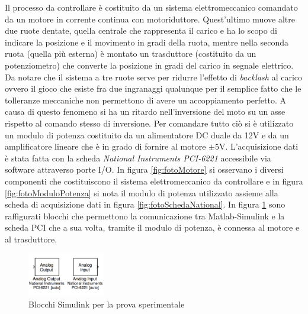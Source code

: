 	\noindent Il processo da controllare è costituito da un sistema elettromeccanico comandato da un motore in corrente continua con motoriduttore. Quest'ultimo muove altre due ruote dentate, quella centrale che rappresenta il carico e ha lo scopo di indicare la posizione e il movimento in gradi della ruota, mentre nella seconda ruota (quella più esterna) è montato un trasduttore (costituito da un potenziometro) che converte la posizione in gradi del carico in segnale elettrico. Da notare che il sistema a tre ruote serve per ridurre l'effetto di \textit{backlash} al carico ovvero il gioco che esiste fra due ingranaggi qualunque per il semplice fatto che le tolleranze meccaniche non permettono di avere un accoppiamento perfetto. A causa di questo fenomeno si ha un ritardo nell'inversione del moto su un asse rispetto al comando stesso di inversione. Per comandare tutto ciò si è utilizzato un modulo di potenza costituito da un alimentatore DC duale da 12V e da un amplificatore lineare che è in grado di fornire al motore $\pm 5$V. L'acquisizione dati è stata fatta con la scheda \textit{National Instruments PCI-6221} accessibile via software attraverso porte I/O. In figura \ref{fig:fotoMotore} si osservano i diversi componenti che costituiscono il sistema elettromeccanico da controllare e in figura \ref{fig:fotoModuloPotenza} si nota il modulo di potenza utilizzato assieme alla scheda di acquisizione dati in figura \ref{fig:fotoSchedaNational}. In figura \ref{fig:blocchiSimulink} sono raffigurati blocchi che permettono la comunicazione tra Matlab-Simulink e la scheda PCI che a sua volta, tramite il modulo di potenza, è connessa al motore e al trasduttore.
	
	\begin{figure}[!h]
		\centering
		\includegraphics[width=0.3\textwidth]{./figure/blocchi_simulink}
		\caption{Blocchi Simulink per la prova sperimentale}
		\label{fig:blocchiSimulink}
	\end{figure}